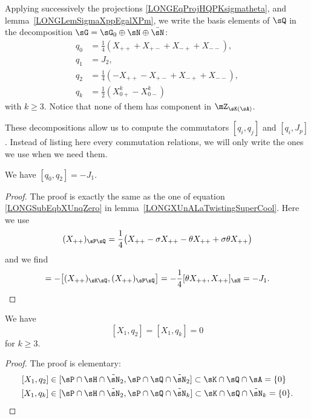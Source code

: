 Applying successively the projections \eqref{LONGEqProjHQPKsigmatheta}, and lemma~\ref{LONGLemSigmaXppEgalXPm}, we write the basis elements of $\sQ$ in the decomposition $\sG=\sG_0\oplus\sN\oplus\bar\sN$:
\begin{subequations}			\label{LONGEqsDecopmQXpmpm}
	\begin{align}
		q_0 & =\frac{1}{ 4 }(X_{++}+X_{+-}+X_{-+}+X_{--}),  \\
		q_1 & =J_2,                                         \\
		q_2 & =\frac{1}{ 4 }(-X_{++}-X_{+-}+X_{-+}+X_{--}), \\
		q_k & =\frac{ 1 }{2}(X^{k}_{0+}-X^{k}_{0-})
	\end{align}
\end{subequations}
with $k\geq 3$. Notice that none of them has component in $\mZ_{\sK(\sA)}$.

These decompositions allow us to compute the commutators $[q_i,q_j]$ and $[q_i,J_p]$. Instead of listing here every commutation relations, we will only write the ones we use when we need them.


\begin{lemma}		\label{LONGLemQzQdeuxJun}
	We have $[q_0,q_2]=-J_1$.
\end{lemma}

\begin{proof}
	The proof is exactly the same as the one of equation \eqref{LONGSubEqbXUnqZero} in lemma~\ref{LONGXUnALaTwistingSuperCool}. Here we use
	\begin{equation}
		(X_{++})_{\sP\sQ}=\frac{1}{ 4 }\big( X_{++}-\sigma X_{++}-\theta X_{++}+\sigma\theta X_{++} \big)
	\end{equation}
	and we find
	\begin{equation}
		[q_0,q_2]=-\big[ (X_{++})_{\sK \sQ},(X_{++})_{\sP\sQ} \big]=-\frac{1}{ 4 }[\theta X_{++},X_{++}]_{\sH}=-J_1.
	\end{equation}
\end{proof}

\begin{lemma}
	We have
	\begin{equation}		\label{LONGEqXunQdeuxcommutent}
		[X_1,q_2]=[X_1,q_k]=0
	\end{equation}
	for $k\geq 3$.
\end{lemma}
\begin{proof}
	The proof is elementary:
	\begin{equation}
		\begin{aligned}[]
			[X_1,q_2] & \in[\sP\cap\sH\cap\tilde\sN_2,\sP\cap\sQ\cap\tilde\sN_2]\subset\sK\cap\sQ\cap\sA=\{ 0 \}          \\
			[X_1,q_k] & \in[\sP\cap\sH\cap\tilde\sN_2,\sP\cap\sQ\cap\tilde\sN_k]\subset\sK\cap\sQ\cap\tilde\sN_k=\{ 0 \}.
		\end{aligned}
	\end{equation}
\end{proof}

